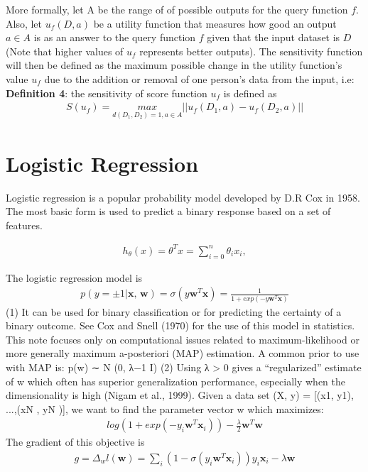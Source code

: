 More formally, let A be the range of of possible outputs for the query function $f$. Also, let $u_f(D,a)$ be a utility function that measures how good an output $a\in A$ is as an answer to the query function $f$ given that the input dataset is $D$ (Note that higher values of $u_f$ represents better outputs). The sensitivity function will then be defined as the maximum possible change in the utility function's value $u_f$ due to the addition or removal of one person's data from the input, i.e: \newline
\textbf{Definition 4}: the sensitivity of score function $u_f$ is defined as
\begin{eqnarray} \label{ExpoMecDef}
S(u_f) = \underset{d(D_1,D_2)=1,a\in A}{max}||u_f(D_1, a)-u_f(D_2,a)||
 \end{eqnarray}
 
 
 \section{Logistic Regression}
 
 Logistic regression is a popular probability model developed by D.R Cox in 1958. The most basic form is used to predict a binary response based on a set of features.
 
 \begin{eqnarray} 
 h_{\theta}(x) = \theta^Tx = \sum_{i=0}^n \theta_i x_i, \nonumber
 \end{eqnarray}
 
 The logistic regression model is
  \begin{eqnarray} 
 p(y = ±1|\textbf{x, w}) = \sigma(y \textbf{w}^T \textbf{x}) = \frac{1}{1 + exp(−y \textbf{w}^T \textbf{x})}
  \end{eqnarray}
 (1)
 It can be used for binary classification or for predicting the certainty of a binary outcome. See Cox  and Snell (1970) for the use of this model in statistics. This note focuses only on computational issues related
 to maximum-likelihood or more generally maximum a-posteriori (MAP) estimation. A common
 prior to use with MAP is:
 p(w) ∼ N (0, λ−1  I) (2)
 Using λ > 0 gives a “regularized” estimate of w which often has superior generalization performance,
 especially when the dimensionality is high (Nigam et al., 1999).
 Given a data set (X, y) = [(x1, y1), ...,(xN , yN )], we want to find the parameter vector w which
 maximizes:
 \begin{eqnarray} 
 log(1 + exp(−y_i \textbf{w}^T \textbf{x}_i)) - \frac{\lambda}{2} \textbf{w}^T \textbf{w}
\end{eqnarray}
 The gradient of this objective is
 \begin{eqnarray} 
 g = \Delta_w l (\textbf{w}) = \sum_{i}^{} (1 - \sigma(y_i \textbf{w}^T	\textbf{x}_i)) y_i \textbf{x}_i - \lambda \textbf{w}
\end{eqnarray} 
